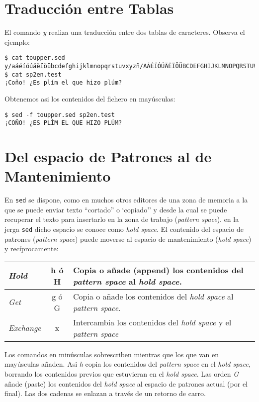 \section{Traducción entre Tablas}
El  comando {\it y} realiza una traducción entre dos tablas de caracteres.
Observa el ejemplo:
\begin{verbatim}
$ cat toupper.sed
y/aáéíóúäëïöübcdefghijklmnopqrstuvxyzñ/AÁÉÍÓÚÄËÏÖÜBCDEFGHIJKLMNOPQRSTUVXYZÑ/
$ cat sp2en.test
¡Coño! ¿Es plím el que hizo plúm?
\end{verbatim}
Obtenemos asi los contenidos del fichero en mayúsculas:
\begin{verbatim}
$ sed -f toupper.sed sp2en.test
¡COÑO! ¿ES PLÍM EL QUE HIZO PLÚM?  
\end{verbatim}

\section{Del espacio de Patrones al de Mantenimiento}
En \verb|sed| se dispone, como en muchos otros editores
de una zona de memoria a la que se puede enviar texto ``cortado''
o `copiado'' y desde la cual se puede recuperar el texto para 
insertarlo en la zona de trabajo  ({\it pattern space}).
en la jerga \verb|sed| dicho espacio se conoce como \emph{hold space}.
El contenido del espacio de patrones ({\it pattern space}) puede moverse al espacio 
de mantenimiento (\emph{hold space}) y recíprocamente:

\vspace{1cm}
\begin{tabular}{|l|c|l|}
\hline
\emph{Hold}     & h ó H & Copia o añade (append) los contenidos del {\it pattern space} al {\it hold space}. \\
\hline
\emph{Get}      & g ó G & Copia o añade los contenidos del {\it hold space} al {\it pattern space}.\\
\hline
\emph{Exchange} &   x   & Intercambia los contenidos del {\it hold space} y el {\it pattern space} \\
\hline
\end{tabular}
\vspace{1cm}

Los comandos en minúsculas sobrescriben mientras que los que van en mayúsculas añaden.
Asi {\it h} copia los contenidos del {\it pattern space} en el {\it hold space}, borrando los
contenidos previos que estuvieran en el {\it hold space}. Las orden {\it G} añade (paste)
los contenidos del {\it hold space} al espacio de patrones actual (por el final).  
Las dos cadenas se enlazan a través de un retorno de carro.

